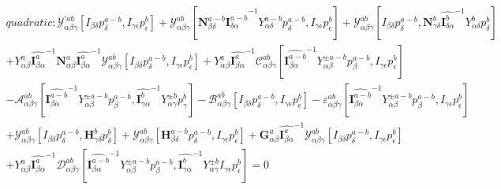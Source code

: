 \documentclass{Note}
\begin{document}
\begin{equation}
\begin{aligned}
quadratic:\mathcal{Y}_{\alpha\beta\gamma}^{'ab}[I_{\beta\delta}p_{\delta}^{a-b},I_{\gamma\epsilon} p_{\epsilon}^{b}]+\mathcal{Y}_{\alpha\beta\gamma}^{ab}[\textbf{N}_{\beta\delta}^{a-b} {\widehat{\textbf{I}_{\delta \alpha}^{a-b}}}^{-1}  Y_{\alpha\delta}^{a-b} p_\delta^{a-b} ,I_{\gamma\epsilon} p_{\epsilon}^{b}]+\mathcal{Y}_{\alpha\beta\gamma}^{ab}[I_{\beta\delta}p_{\delta}^{a-b},\textbf{N}_{\gamma\delta}^{b} {\widehat{\textbf{I}_{\delta \alpha}^{b}}}^{-1}  Y_{\alpha\delta}^{b} p_\delta^{b} ]\\
+Y_{\alpha\beta}^{a} {\widehat{\textbf{I}_{\beta \alpha}^a}}^{-1}   \textbf{N}_{\alpha\beta}^a {\widehat{\textbf{I}_{\beta \alpha}^a}}^{-1} \mathcal{Y}_{\alpha\beta\gamma}^{ab}[I_{\beta\delta}p_{\delta}^{a-b},I_{\gamma\epsilon} p_{\epsilon}^{b}] +Y_{\alpha\beta}^{a}{\widehat{\textbf{I}_{\beta \alpha}^a}}^{-1}  \mathcal{C}_{\alpha\beta\gamma}^{ab}[{\widehat{\textbf{I}_{\beta \alpha}^{a-b}}}^{-1}  Y_{\alpha\beta}^{\pm a-b} p_\beta^{a-b} ,I_{\gamma\epsilon} p_{\epsilon}^{b}]\\
-\mathcal{A}_{\alpha\beta\gamma}^{ab}[{\widehat{\textbf{I}_{\beta \alpha}^{a-b}}}^{-1}  Y_{\alpha\beta}^{\pm a-b} p_\beta^{a-b},{\widehat{\textbf{I}_{\gamma \alpha}^{b}}}^{-1}  Y_{\alpha\gamma}^{\pm b} p_\gamma^{b}]-\mathcal{B}_{\alpha\beta\gamma}^{ab}[I_{\beta\delta}p_{\delta}^{a-b},I_{\gamma\epsilon} p_{\epsilon}^{b}]-\varepsilon_{\alpha\beta\gamma}^{ab}[{\widehat{\textbf{I}_{\beta \alpha}^{a-b}}}^{-1}  Y_{\alpha\beta}^{\pm a-b} p_\beta^{a-b} ,I_{\gamma\epsilon} p_{\epsilon}^{b}]\\
+\mathcal{Y}_{\alpha\beta\gamma}^{ab}[I_{\beta\delta}p_{\delta}^{a-b},\textbf{H}_{\gamma\delta}^{b} p_{\delta}^{b}]+\mathcal{Y}_{\alpha\beta\gamma}^{ab}[\textbf{H}_{\beta\delta}^{a-b} p_{\delta}^{a-b},I_{\gamma\epsilon} p_{\epsilon}^{b}]+\textbf{G}_{\alpha\beta}^a  {\widehat{\textbf{I}_{\beta \alpha}^a}}^{-1} \mathcal{Y}_{\alpha\beta\gamma}^{ab}[I_{\beta\delta}p_{\delta}^{a-b},I_{\gamma\epsilon} p_{\epsilon}^{b}] \\
+Y_{\alpha\beta}^{a} {\widehat{\textbf{I}_{\beta \alpha}^a}}^{-1}  \mathcal{D}_{\alpha\beta\gamma}^{ab}[{\widehat{\textbf{I}_{\beta \alpha}^{a-b}}}^{-1}  Y_{\alpha\beta}^{\pm a-b} p_\beta^{a-b},{\widehat{\textbf{I}_{\gamma \alpha}^{b}}}^{-1}  Y_{\alpha\gamma}^{\pm b} I_{\gamma\epsilon} p_{\epsilon}^{b}]=0
\end{aligned}
\end{equation}
\end{document}
